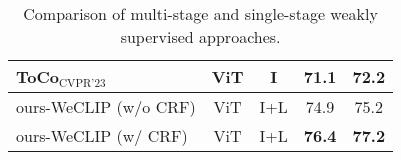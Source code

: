 \begin{table}[ht]
\begin{tabular}{l c c c c}
        ToCo$_{\text{CVPR'23}}$~\cite{40}                                   & ViT        & I    & 71.1          & 72.2          \\
        \hline
        ours-WeCLIP (w/o CRF)                                               & ViT        & I+L  & 74.9          & 75.2          \\
        ours-WeCLIP (w/ CRF)                                                & ViT        & I+L  & \textbf{76.4} & \textbf{77.2} \\
        \hline
    \end{tabular}
    \caption{Comparison of multi-stage and single-stage weakly supervised approaches.}
    \label{tab:quantitative_results}
\end{table}
